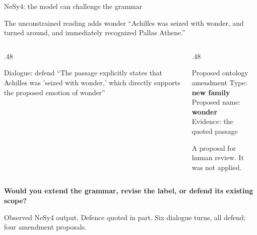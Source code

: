 \documentclass[aspectratio=169,10pt]{beamer}
\newcommand{\key}[1]{\textcolor{aegean}{\textbf{#1}}}
\newcommand{\source}[1]{\vfill{\scriptsize\color{slate}#1\par}}
\newcommand{\question}[1]{\medskip\par\key{#1}\par}
\begin{document}
\begin{frame}{NeSy4: the model can challenge the grammar}
  \begin{block}{The unconstrained reading adds wonder}
    “Achilles was seized with wonder, and turned around, and immediately recognized Pallas Athene.”
  \end{block}
  \begin{columns}[T]
    \begin{column}{.48\textwidth}
      \begin{block}{Dialogue: defend}
        “The passage explicitly states that Achilles was 'seized with wonder,' which directly supports the proposed emotion of wonder”
      \end{block}
    \end{column}
    \begin{column}{.48\textwidth}
      \begin{block}{Proposed ontology amendment}
        Type: \textbf{new family}\\
        Proposed name: \key{wonder}\\
        Evidence: the quoted passage
      \end{block}
      \small A proposal for human review. It was not applied.
    \end{column}
  \end{columns}
  \question{Would you extend the grammar, revise the label, or defend its existing scope?}
  \source{Observed NeSy4 output. Defence quoted in part. Six dialogue turns, all defend; four amendment proposals.}
\end{frame}
\end{document}
